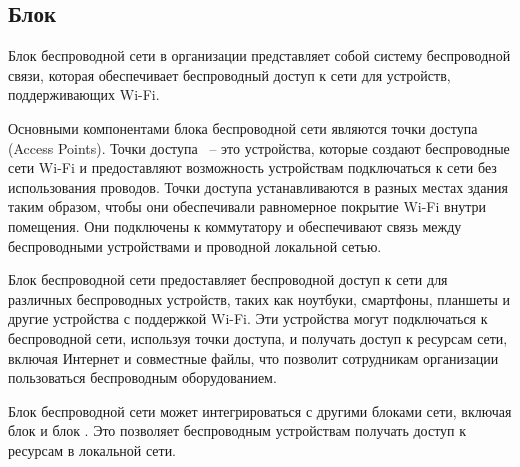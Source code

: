 \subsection{Блок \blockAccessPoint}

Блок беспроводной сети в организации представляет собой систему беспроводной связи, 
которая обеспечивает беспроводный доступ к сети для устройств, поддерживающих Wi-Fi.

Основными компонентами блока беспроводной сети являются точки доступа (Access Points). 
Точки доступа ~-- это устройства, которые создают беспроводные сети Wi-Fi и предоставляют возможность устройствам подключаться к сети без использования проводов.
Точки доступа устанавливаются в разных местах здания таким образом, чтобы они обеспечивали равномерное покрытие Wi-Fi внутри помещения.
Они подключены к коммутатору и обеспечивают связь между беспроводными устройствами и проводной локальной сетью.

Блок беспроводной сети предоставляет беспроводной доступ к сети для различных беспроводных устройств, 
таких как ноутбуки, смартфоны, планшеты и другие устройства с поддержкой Wi-Fi. 
Эти устройства могут подключаться к беспроводной сети, используя точки доступа, и получать доступ к ресурсам сети, 
включая Интернет и совместные файлы, что позволит сотрудникам организации пользоваться беспроводным оборудованием.

Блок беспроводной сети может интегрироваться с другими блоками сети, включая блок \blockDevices и блок \blockVideo\@. 
Это позволяет беспроводным устройствам получать доступ к ресурсам в локальной сети.